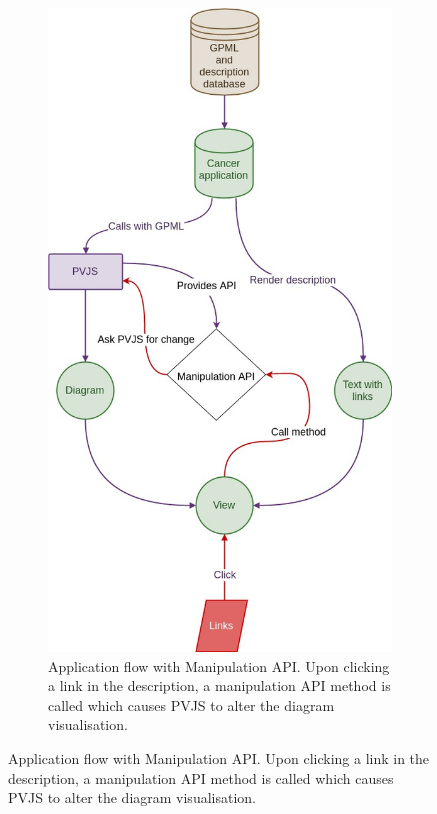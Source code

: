 \documentclass[a4paper,12pt,twoside]{apa}
\begin{document}
\begin{figure}[h]
  \centering
  \begin{subfigure}[b]{0.48\textwidth}
    \includegraphics[width=\textwidth]{figures/manipulation_api.jpg}
    \caption{Application flow with Manipulation API. Upon clicking a link in the description, a manipulation API method is called which causes PVJS to alter the diagram visualisation.}

\end{subfigure}
\end{figure}
\end{document}
